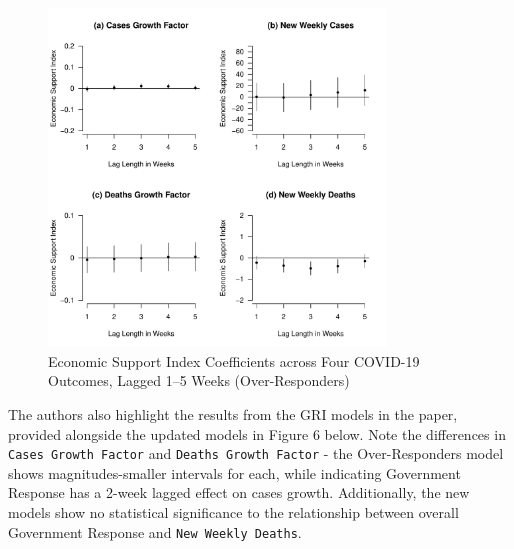 \documentclass[12pt,letterpaper]{article}
\begin{document}
	\begin{figure}[h!]
		\centering
		\includegraphics[width=0.8\textwidth]{aesi.pdf}
		\caption{Economic Support Index Coefficients across Four COVID-19 Outcomes, Lagged 1–5 Weeks (Over-Responders)}
		\label{fig:aesi}
	\end{figure}

	\vspace{.25cm}
	
	\noindent The authors also highlight the results from the GRI models in the paper, provided alongside the updated models in Figure 6 below. Note the differences in \texttt{Cases Growth Factor} and \texttt{Deaths Growth Factor} - the Over-Responders  model shows magnitudes-smaller intervals for each, while indicating Government Response has a 2-week lagged effect on cases growth. Additionally, the new models show no statistical significance to the relationship between overall Government Response and \texttt{New Weekly Deaths}.
	
\end{document}
